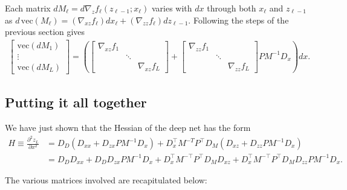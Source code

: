 \documentclass{article}
\begin{document}
Each matrix $dM_\ell = d \nabla_z f_\ell(z_{\ell-1}; x_\ell)$ varies with $dx$ through both $x_\ell$ and $z_{\ell -1}$
as $d\,\mathrm{vec} \left(M_\ell\right) = \left(\nabla_{xz} f_\ell\right) dx_\ell + \left(\nabla_{zz} f_\ell\right)
    dz_{\ell-1}$. Following the steps of the previous section gives
\begin{align}
    \begin{bmatrix}
        \mathrm{vec}\left(dM_1\right) \\
        \vdots                        \\
        \mathrm{vec}\left(dM_L\right)
    \end{bmatrix}
    =
    \left(
    \begin{bmatrix}
        \nabla_{xz} f_1 &        &                 \\
                        & \ddots &                 \\
                        &        & \nabla_{xz} f_L
    \end{bmatrix}
    +
    \begin{bmatrix}
        \nabla_{zz} f_1 \\ &\ddots& \\ && \nabla_{zz} f_L
    \end{bmatrix}
    P M^{-1} D_x
    \right)dx.
\end{align}

\subsection{Putting it all together}

We have just shown that the Hessian of the deep net has the form
\begin{align}
    H \equiv \frac{\partial^2 z_L}{\partial x^2}
    & = D_D \left(D_{xx} + D_{zx} PM^{-1} D_x\right) + D_x^\top M^{-T}P^\top D_M \left(D_{xz}+D_{zz}P M^{-1}D_x\right)           \\
    \label{eq:hessian}
    & = D_DD_{xx}  + D_DD_{zx} PM^{-1} D_x + D_x^\top M^{-\top}P^\top D_M D_{xz}+D_x^\top M^{-\top}P^\top D_M D_{zz}P M^{-1}D_x.
\end{align}

The various matrices involved are recapitulated below:
\end{document}
